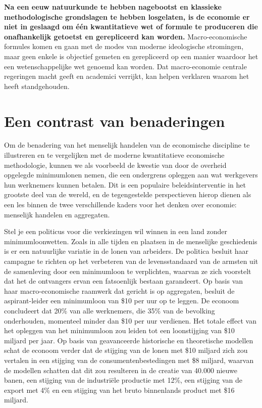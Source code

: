 \textbf{Na een eeuw natuurkunde te hebben nagebootst en klassieke methodologische grondslagen te hebben losgelaten, is de economie er niet in geslaagd om één kwantitatieve wet of formule te produceren die onafhankelijk getoetst en gerepliceerd kan worden.} Macro-economische formules komen en gaan met de modes van moderne ideologische stromingen, maar geen enkele is objectief gemeten en gerepliceerd op een manier waardoor het een wetenschappelijke wet genoemd kan worden. Dat macro-economie centrale regeringen macht geeft en academici verrijkt, kan helpen verklaren waarom het heeft standgehouden.

\section{Een contrast van benaderingen}

Om de benadering van het menselijk handelen van de economische discipline te illustreren en te vergelijken met de moderne kwantitatieve economische methodologie, kunnen we als voorbeeld de kwestie van door de overheid opgelegde minimumlonen nemen, die een ondergrens opleggen aan wat werkgevers hun werknemers kunnen betalen. Dit is een populaire beleidsinterventie in het grootste deel van de wereld, en de tegengestelde perspectieven hierop dienen als een les binnen de twee verschillende kaders voor het denken over economie: menselijk handelen en aggregaten.

Stel je een politicus voor die verkiezingen wil winnen in een land zonder minimumloonwetten. Zoals in alle tijden en plaatsen in de menselijke geschiedenis is er een natuurlijke variatie in de lonen van arbeiders. De politica besluit haar campagne te richten op het verbeteren van de levensstandaard van de armsten uit de samenleving door een minimumloon te verplichten, waarvan ze zich voorstelt dat het de ontvangers ervan een fatsoenlijk bestaan garandeert. Op basis van haar macro-economische raamwerk dat gericht is op aggregaten, besluit de aspirant-leider een minimumloon van \$10 per uur op te leggen. De econoom concludeert dat 20\% van alle werknemers, die 35\% van de bevolking onderhouden, momenteel minder dan \$10 per uur verdienen. Het totale effect van het opleggen van het minimumloon zou leiden tot een loonstijging van \$10 miljard per jaar. Op basis van geavanceerde historische en theoretische modellen schat de econoom verder dat de stijging van de lonen met \$10 miljard zich zou vertalen in een stijging van de consumentenbestedingen met \$8 miljard, waarvan de modellen schatten dat dit zou resulteren in de creatie van 40.000 nieuwe banen, een stijging van de industriële productie met 12\%, een stijging van de export met 4\% en een stijging van het bruto binnenlands product met \$16 miljard.

